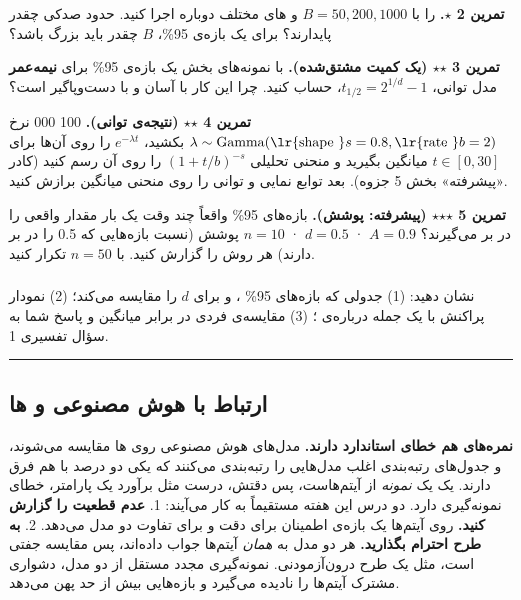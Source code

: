 \textbf{تمرین 2 \ensuremath{\star}.}  را با \(B = 50, 200, 1000\) و
های مختلف دوباره اجرا کنید. حدود صدکی چقدر پایدارند؟ برای یک
بازه‌ی 95\%، \(B\) چقدر باید بزرگ باشد؟

\textbf{تمرین 3 \ensuremath{\star}\ensuremath{\star} (یک کمیت مشتق‌شده).} با نمونه‌های  بخش
 یک بازه‌ی 95\% برای \textbf{نیمه‌عمر} مدل توانی،
\(t_{1/2} = 2^{1/d} - 1\)، حساب کنید. چرا این کار با  آسان
و با  دست‌وپاگیر است؟

\textbf{تمرین 4 \ensuremath{\star}\ensuremath{\star} (نتیجه‌ی توانی).} 100 000 نرخ
\(\lambda \sim \mathrm{Gamma}(\text{\lr{shape }} s = 0.8, \text{\lr{rate }} b = 2)\)
بکشید، \(e^{-\lambda t}\) را روی آن‌ها برای \(t \in [0, 30]\) میانگین
بگیرید و منحنی تحلیلی \((1 + t/b)^{-s}\) را روی آن رسم کنید (کادر
«پیشرفته» بخش 5 جزوه). بعد توابع نمایی و توانی را روی منحنی میانگین
برازش کنید.

\textbf{تمرین 5 \ensuremath{\star}\ensuremath{\star}\ensuremath{\star} (پیشرفته: پوشش).} بازه‌های 95\% واقعاً چند وقت یک بار
مقدار واقعی را در بر می‌گیرند؟ \(A = 0.9\) · \(d = 0.5\) · \(n = 10\)
پوشش (نسبت بازه‌هایی که 0.5 را در بر دارند) هر روش را گزارش کنید. با
\(n = 50\) تکرار کنید.

\subsubsection{\texorpdfstring{}{lab check-off}}

نشان دهید: (1) جدولی که بازه‌های 95\% ،  و
 برای \(d\) را مقایسه می‌کند؛ (2) نمودار پراکنش
 با یک جمله درباره‌ی ؛ (3) مقایسه‌ی فردی در
برابر میانگین و پاسخ شما به سؤال تفسیری 1.

\begin{center}\rule{0.5\linewidth}{0.5pt}\end{center}

\subsection{\texorpdfstring{ارتباط با هوش مصنوعی و
ها}{ارتباط با هوش مصنوعی و LLMها}}

\textbf{نمره‌های  هم خطای استاندارد دارند.} مدل‌های هوش
مصنوعی روی ها مقایسه می‌شوند، و جدول‌های رتبه‌بندی
 اغلب مدل‌هایی را رتبه‌بندی می‌کنند که یکی دو درصد با هم
فرق دارند. یک  یک \emph{نمونه} از آیتم‌هاست، پس دقتش، درست
مثل برآورد یک پارامتر، خطای نمونه‌گیری دارد. دو درس این هفته مستقیماً به
کار می‌آیند: 1. \textbf{عدم قطعیت را گزارش کنید.}  روی
آیتم‌ها یک بازه‌ی اطمینان برای دقت و برای تفاوت دو مدل می‌دهد. 2.
\textbf{به طرح احترام بگذارید.} هر دو مدل به \emph{همان} آیتم‌ها جواب
داده‌اند، پس مقایسه جفتی است، مثل یک طرح درون‌آزمودنی. نمونه‌گیری مجدد
مستقل از دو مدل، دشواری مشترک آیتم‌ها را نادیده می‌گیرد و بازه‌هایی بیش از
حد پهن می‌دهد.

